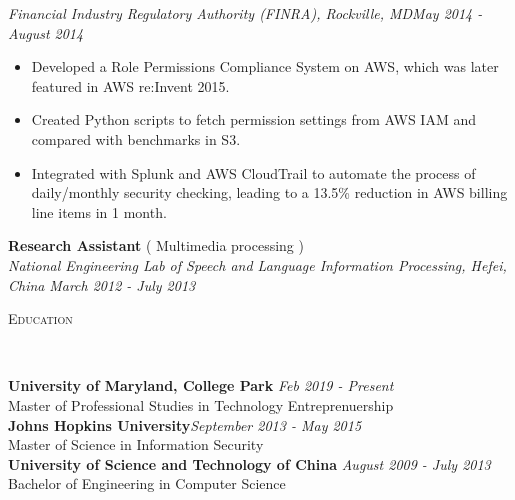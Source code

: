 \documentclass[3pt]{article}
\newenvironment{changemargin}[2]{%
  \begin{list}{}{%
    \setlength{\topsep}{0pt}%
    \setlength{\leftmargin}{#1}%
    \setlength{\rightmargin}{#2}%
    \setlength{\listparindent}{\parindent}%
    \setlength{\itemindent}{\parindent}%
    \setlength{\parsep}{\parskip}%
  }%
  \item[]}{\end{list}
}
\newcommand{\lineover}{
	\begin{changemargin}{-0.05in}{-0.05in}
		\vspace*{-8pt}
		\hrulefill \\
		\vspace*{-2pt}
	\end{changemargin}
}
\newcommand{\header}[1]{
	\begin{changemargin}{-0.5in}{-0.5in}
		{\Large \scshape{#1}}\\
  	\lineover
	\end{changemargin}
}
\newenvironment{body} {
	\vspace*{-16pt}
	\begin{changemargin}{-0.25in}{-0.5in}
  }	
	{\end{changemargin}
}
\begin{document}
\begin{body}
    \emph{Financial Industry Regulatory Authority (FINRA), Rockville, MD}\hfill \emph{May 2014 - August 2014}\\
     \begin{itemize} \itemsep -0.5pt
    \item{Developed a Role Permissions Compliance System on AWS, which was later featured in AWS re:Invent 2015.}
     \item {Created Python scripts to fetch permission settings from AWS IAM and compared with benchmarks in S3.}
     \item {Integrated with Splunk and AWS CloudTrail to automate the process of daily/monthly security checking, leading to a 13.5\% reduction in AWS billing line items in 1 month.}
   
    \end{itemize}
	
	\vspace{1pt}
    \textbf{Research Assistant} ( Multimedia processing )\\
    \emph{National Engineering Lab of Speech and Language Information Processing,  Hefei, China } \hfill \emph{March 2012 - July 2013 }

\end{body}
\bigskip


\header{Education}

\begin{body}
	\vspace{17pt}
	\textbf{University of Maryland, College Park} \hfill \emph{Feb 2019 - Present} \\
	Master of Professional Studies in Technology Entreprenuership \\
  \smallskip
	\textbf{Johns Hopkins University}{}\hfill \emph{September 2013 - May 2015}{} \\
	Master of Science in Information Security \hfill \\
  \smallskip
	\textbf{University of Science and Technology of China} \hfill \emph{August 2009 - July 2013} \\
	Bachelor of Engineering in Computer Science \\
\end{body}
\end{document}

